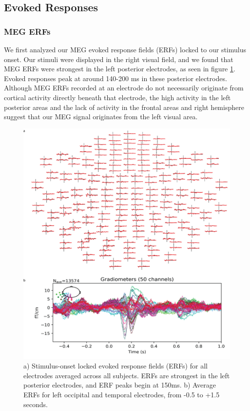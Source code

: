 \documentclass[../main.tex]{subfiles}
\begin{document}
\subsection{Evoked Responses}
\subsubsection{MEG ERFs}
We first analyzed our MEG evoked response fields (ERFs) locked to our stimulus onset. Our stimuli were displayed in the right visual field, and we found that MEG ERFs were strongest in the left posterior electrodes, as seen in figure \ref{erfs}. Evoked responses peak at around 140-200 ms in these posterior electrodes. Although MEG ERFs recorded at an electrode do not necessarily originate from cortical activity directly beneath that electrode, the high activity in the left posterior areas and the lack of activity in the frontal areas and right hemisphere suggest that our MEG signal originates from the left visual area.

\begin{figure}
    \centering
    \includegraphics[scale=0.7]{figures/results/erf_results.png}
    \caption{a) Stimulus-onset locked evoked response fields (ERFs) for all electrodes averaged across all subjects. ERFs are strongest in the left posterior electrodes, and ERF peaks begin at 150ms. b) Average ERFs for left occipital and temporal electrodes, from -0.5 to +1.5 seconds.}
    \label{erfs}
\end{figure}
\end{document}
